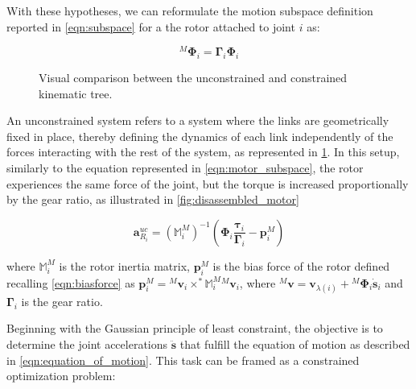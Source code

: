 With these hypotheses, we can reformulate the motion subspace definition reported in \cref{eqn:subspace} for a the rotor attached to joint $i$ as:

\begin{equation}
    \label{eqn:motor_subspace}
    {} ^M \boldsymbol{\Phi} _i = \boldsymbol{\Gamma} _i \boldsymbol{\Phi} _i
\end{equation}


\begin{figure}
    \centering
    \caption{Visual comparison between the unconstrained and constrained kinematic tree.}
    \label{fig:uc_and_constr_tree}
\end{figure}

An unconstrained system refers to a system where the links are geometrically fixed in place, thereby defining the dynamics of each link independently of the forces interacting with the rest of the system, as represented in \cref{fig:uc_and_constr_tree}. In this setup, similarly to the equation represented in \cref{eqn:motor_subspace}, the rotor experiences the same force of the joint, but the torque is increased proportionally by the gear ratio, as illustrated in \cref{fig:disassembled_motor}

\begin{equation}
    \mathbf{a} ^{uc} _{R _i} = (\mathbb{M} ^M _i) ^{-1}(\boldsymbol{\Phi} _i \frac{\boldsymbol{\tau} _i}{\boldsymbol{\Gamma} _i} - \mathbf{p} ^M _i)
\end{equation}

where $\mathbb{M} ^M _i$ is the rotor inertia matrix, $\mathbf{p} ^M _i$ is the bias force of the rotor defined recalling \cref{eqn:biasforce} as  $\mathbf{p} ^M _i = {} ^M \mathbf{v} _i\times ^* \mathbb{M} ^M _i {} ^M \mathbf{v} _i$, where ${} ^M \mathbf{v} = \mathbf{v} _{\lambda (i)} + {} ^M \boldsymbol{\Phi} _i \dot{\mathbf{s}} _i$ and $\boldsymbol{\Gamma} _i$ is the gear ratio.

Beginning with the Gaussian principle of least constraint, the objective is to determine the joint accelerations $\ddot{\mathbf{s}}$ that fulfill the equation of motion as described in \cref{eqn:equation_of_motion}. This task can be framed as a constrained optimization problem:

